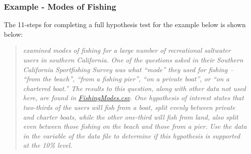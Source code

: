 \documentclass[10pt,openany]{book}\usepackage[]{graphicx}\usepackage[]{color}
\begin{document}
\subsubsection{Example - Modes of Fishing}
The 11-steps  for completing a full hypothesis test for the example below is shown below:

\begin{quote}
\textsl{\cite{HerrigesKing1999} examined modes of fishing for a large number of recreational saltwater users in southern California.  One of the questions asked in their Southern California Sportfishing Survey was what ``mode'' they used for fishing -- ``from the beach'', ``from a fishing pier'', ``on a private boat'', or ``on a chartered boat.''  The results to this question, along with other data not used here, are found in \href{https://raw.githubusercontent.com/droglenc/NCData/master/FishingModes.csv}{FishingModes.csv}.  One hypothesis of interest states that two-thirds of the users will fish from a boat, split evenly between private and charter boats, while the other one-third will fish from land, also split even between those fishing on the beach and those from a pier.  Use the data in the  variable of the data file to determine if this hypothesis is supported at the 10\% level.}
\end{quote}
\end{document}
